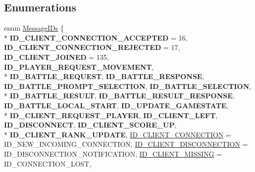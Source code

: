 \subsection*{Enumerations}
\begin{DoxyCompactItemize}
\item 
enum \hyperlink{namespace_champ_net_plugin_a2ade5cfa7cf6c25ab7236c6b54a57821}{Message\-I\-Ds} \{ \\*
{\bfseries I\-D\-\_\-\-C\-L\-I\-E\-N\-T\-\_\-\-C\-O\-N\-N\-E\-C\-T\-I\-O\-N\-\_\-\-A\-C\-C\-E\-P\-T\-E\-D} = 16, 
{\bfseries I\-D\-\_\-\-C\-L\-I\-E\-N\-T\-\_\-\-C\-O\-N\-N\-E\-C\-T\-I\-O\-N\-\_\-\-R\-E\-J\-E\-C\-T\-E\-D} = 17, 
{\bfseries I\-D\-\_\-\-C\-L\-I\-E\-N\-T\-\_\-\-J\-O\-I\-N\-E\-D} = 135, 
{\bfseries I\-D\-\_\-\-P\-L\-A\-Y\-E\-R\-\_\-\-R\-E\-Q\-U\-E\-S\-T\-\_\-\-M\-O\-V\-E\-M\-E\-N\-T}, 
\\*
{\bfseries I\-D\-\_\-\-B\-A\-T\-T\-L\-E\-\_\-\-R\-E\-Q\-U\-E\-S\-T}, 
{\bfseries I\-D\-\_\-\-B\-A\-T\-T\-L\-E\-\_\-\-R\-E\-S\-P\-O\-N\-S\-E}, 
{\bfseries I\-D\-\_\-\-B\-A\-T\-T\-L\-E\-\_\-\-P\-R\-O\-M\-P\-T\-\_\-\-S\-E\-L\-E\-C\-T\-I\-O\-N}, 
{\bfseries I\-D\-\_\-\-B\-A\-T\-T\-L\-E\-\_\-\-S\-E\-L\-E\-C\-T\-I\-O\-N}, 
\\*
{\bfseries I\-D\-\_\-\-B\-A\-T\-T\-L\-E\-\_\-\-R\-E\-S\-U\-L\-T}, 
{\bfseries I\-D\-\_\-\-B\-A\-T\-T\-L\-E\-\_\-\-R\-E\-S\-U\-L\-T\-\_\-\-R\-E\-S\-P\-O\-N\-S\-E}, 
{\bfseries I\-D\-\_\-\-B\-A\-T\-T\-L\-E\-\_\-\-L\-O\-C\-A\-L\-\_\-\-S\-T\-A\-R\-T}, 
{\bfseries I\-D\-\_\-\-U\-P\-D\-A\-T\-E\-\_\-\-G\-A\-M\-E\-S\-T\-A\-T\-E}, 
\\*
{\bfseries I\-D\-\_\-\-C\-L\-I\-E\-N\-T\-\_\-\-R\-E\-Q\-U\-E\-S\-T\-\_\-\-P\-L\-A\-Y\-E\-R}, 
{\bfseries I\-D\-\_\-\-C\-L\-I\-E\-N\-T\-\_\-\-L\-E\-F\-T}, 
{\bfseries I\-D\-\_\-\-D\-I\-S\-C\-O\-N\-N\-E\-C\-T}, 
{\bfseries I\-D\-\_\-\-C\-L\-I\-E\-N\-T\-\_\-\-S\-C\-O\-R\-E\-\_\-\-U\-P}, 
\\*
{\bfseries I\-D\-\_\-\-C\-L\-I\-E\-N\-T\-\_\-\-R\-A\-N\-K\-\_\-\-U\-P\-D\-A\-T\-E}, 
\hyperlink{namespace_champ_net_plugin_a2ade5cfa7cf6c25ab7236c6b54a57821aecc0564c52e3106cfe012e5533b080da}{I\-D\-\_\-\-C\-L\-I\-E\-N\-T\-\_\-\-C\-O\-N\-N\-E\-C\-T\-I\-O\-N} = I\-D\-\_\-\-N\-E\-W\-\_\-\-I\-N\-C\-O\-M\-I\-N\-G\-\_\-\-C\-O\-N\-N\-E\-C\-T\-I\-O\-N, 
\hyperlink{namespace_champ_net_plugin_a2ade5cfa7cf6c25ab7236c6b54a57821a2ed0fbbbbe782bca6c76277c89050ad9}{I\-D\-\_\-\-C\-L\-I\-E\-N\-T\-\_\-\-D\-I\-S\-C\-O\-N\-N\-E\-C\-T\-I\-O\-N} = I\-D\-\_\-\-D\-I\-S\-C\-O\-N\-N\-E\-C\-T\-I\-O\-N\-\_\-\-N\-O\-T\-I\-F\-I\-C\-A\-T\-I\-O\-N, 
\hyperlink{namespace_champ_net_plugin_a2ade5cfa7cf6c25ab7236c6b54a57821a31932f93b241ffddf903d32af0fc2155}{I\-D\-\_\-\-C\-L\-I\-E\-N\-T\-\_\-\-M\-I\-S\-S\-I\-N\-G} = I\-D\-\_\-\-C\-O\-N\-N\-E\-C\-T\-I\-O\-N\-\_\-\-L\-O\-S\-T, 

\end{DoxyCompactItemize}
